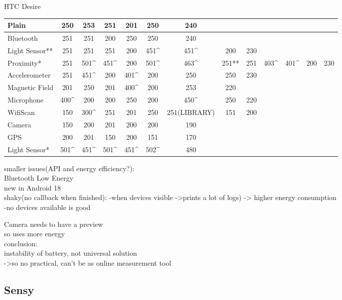 	HTC Desire\\
	\begin{table}
    \begin{tabular}{| l | c | c | c | c | c | c | c | c | c | c | c | c |}
    \hline
    Plain          & 250  & 253  & 251  & 201  & 250  & 240          & ~     & ~   & ~    & ~    & ~   & ~   \\\hline
    Bluetooth      & 251  & 251  & 200  & 250  & 250  & 240          & ~     & ~   & ~    & ~    & ~   & ~   \\\hline
    Light Sensor** & 251  & 251  & 251  & 200  & 451\^ & 451\^        & 200   & 230 & ~    & ~    & ~   & ~   \\ \hline
    Proximity*     & 251  & 501\^ & 451\^ & 200  & 501\^ & 463\^        & 251** & 251 & 403\^ & 401\^ & 200 & 230 \\ \hline
    Accelerometer  & 251  & 451\^ & 200  & 401\^ & 200  & 250          & 250   & 230 & ~    & ~    & ~   & ~   \\ \hline
    Magnetic Field & 201  & 250  & 201  & 400\^ & 200  & 253          & 220   & ~   & ~    & ~    & ~   & ~   \\ \hline
    Microphone     & 400\^ & 200  & 200  & 250  & 200  & 450\^        & 250   & 220 & ~    & ~    & ~   & ~   \\ \hline
    WifiScan       & 150  & 300\^ & 251  & 201  & 250  & 251(LIBRARY) & 151   & 200 & ~    & ~    & ~   & ~   \\ \hline
    Camera         & 150  & 200  & 201  & 200  & 200  & 190          & ~     & ~   & ~    & ~    & ~   & ~   \\ \hline
    GPS            & 200  & 201  & 150  & 200  & 151  & 170          & ~     & ~   & ~    & ~    & ~   & ~   \\ \hline
    Light Sensor*  & 501\^ & 451\^ & 501\^ & 451\^ & 502\^ & 480          & ~     & ~   & ~    & ~    & ~   & ~   \\ \hline
    \end{tabular}
\end{table}

smaller issues(API and energy efficiency?):\\
	Bluetooth Low Energy\\
		new in Android 18\\
		shaky(no callback when finished):
			-when devices visible ->prints a lot of logs) -> higher energy consumption\\
			-no devices available is good
		
	Camera needs to have a preview\\
		so uses more energy\\
   
   
conclusion:\\
	instability of battery, not universal solution\\
		->so no practical, can't be as online measurement tool\\

\subsection{Sensy}